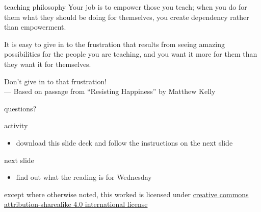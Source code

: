 \documentclass[10pt,t,usenames,dvipsnames]{beamer}
\begin{document}
  \begin{frame}{teaching philosophy}
    Your job is to empower those you teach; when you do for them what they
    should be doing for themselves, you create dependency rather than
    empowerment.

    It is easy to give in to the frustration that results from seeing amazing
    possibilities for the people you are teaching, and you want it more for them
    than they want it for themselves. 

    Don’t give in to that frustration! \\
    \hfill \footnotesize{--- Based on passage from ``Resisting Happiness'' by
      Matthew Kelly}

  \end{frame}

  \begin{frame}[standout]
    \ifnotes
    \fi
    questions?
  \end{frame}

  \appendix

  \begin{frame}{activity}
    \begin{itemize}
      \item download this slide deck and follow the instructions on the next
        slide
    \end{itemize}

  \end{frame}

  \ifnotes\else
  \begin{frame}{next slide}
    \begin{itemize}
      \item find out what the reading is for Wednesday
    \end{itemize}
  \end{frame}
  \fi

  \begin{frame}[c]
    \begin{center}\ccbysa\end{center}

    except where otherwise noted, this worked is licensed under
    \href{http://creativecommons.org/licenses/by-sa/4.0/}{creative commons
    attribution-sharealike 4.0 international license}
  \end{frame}
\end{document}

